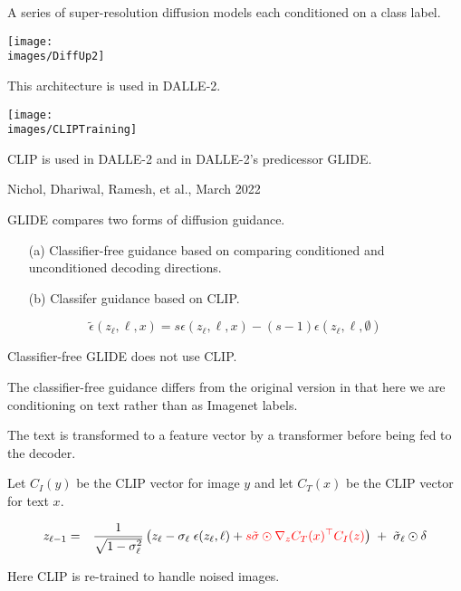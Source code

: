 {A series of super-resolution diffusion models each conditioned on a class label.

\centerline{\texttt{[image: \\images/DiffUp2]}}

\vfill
This architecture is used in DALLE-2.


\centerline{\texttt{[image: \\images/CLIPTraining]}}

\vfill
CLIP is used in DALLE-2 and in DALLE-2's predicessor GLIDE.

         {Nichol, Dhariwal, Ramesh, et al., March 2022}

GLIDE compares two forms of diffusion guidance.

\vfill
\begin{itemize}
\item[(a)] Classifier-free guidance based on comparing conditioned and unconditioned decoding directions.

\vfill
\item[(b)] Classifer guidance based on CLIP.
\end{itemize}


$$\tilde{\epsilon}(z_\ell,\ell,x) = s\epsilon(z_\ell,\ell,x) - (s-1)\epsilon(z_\ell,\ell,\emptyset)$$

\vfill
Classifier-free GLIDE does not use CLIP.

\vfill
The classifier-free guidance differs from the original version in that here we are conditioning on text
rather than as Imagenet labels.

\vfill
The text is transformed to a feature vector by a transformer before being fed to the decoder.


Let $C_I(y)$ be the CLIP vector for image $y$ and let $C_T(x)$ be the CLIP vector for text $x$.

{\huge
\begin{eqnarray*}
z_{\ell-1}  & = & \frac{1}{\sqrt{1-\sigma_\ell^2}}\left(z_\ell - \sigma_\ell\; \epsilon(z_\ell,\ell) + {\color{red} s \tilde{\sigma}\odot\nabla_{z} C_T(x)^\top C_I(z)}\right)\; +\; \tilde{\sigma}_\ell\odot\delta
\end{eqnarray*}
}

\vfill
Here CLIP is re-trained to handle noised images.

}
